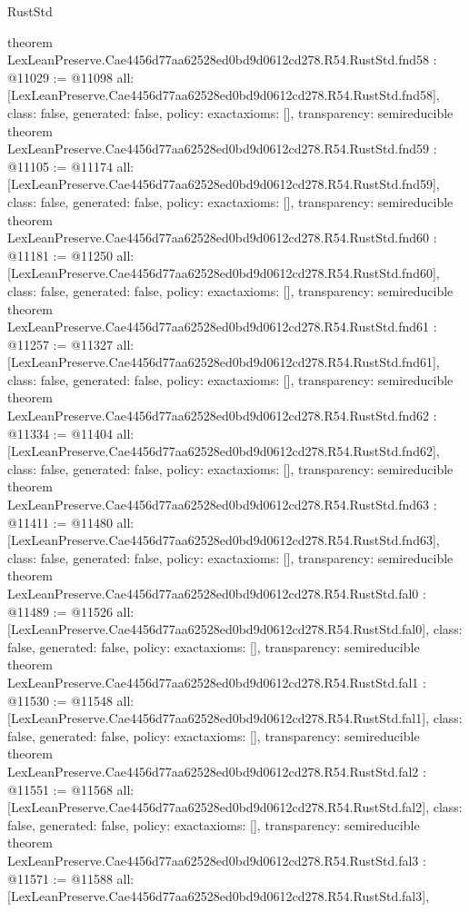 \begin{lexlean}{RustStd}
\begin{coremodule}
{}
theorem LexLeanPreserve.Cae4456d77aa62528ed0bd9d0612cd278.R54.RustStd.fnd58 : @11029 := @11098 {
  all: [LexLeanPreserve.Cae4456d77aa62528ed0bd9d0612cd278.R54.RustStd.fnd58],
  class: false,
  generated: false,
  policy: exact{axioms: []},
  transparency: semireducible
}
theorem LexLeanPreserve.Cae4456d77aa62528ed0bd9d0612cd278.R54.RustStd.fnd59 : @11105 := @11174 {
  all: [LexLeanPreserve.Cae4456d77aa62528ed0bd9d0612cd278.R54.RustStd.fnd59],
  class: false,
  generated: false,
  policy: exact{axioms: []},
  transparency: semireducible
}
theorem LexLeanPreserve.Cae4456d77aa62528ed0bd9d0612cd278.R54.RustStd.fnd60 : @11181 := @11250 {
  all: [LexLeanPreserve.Cae4456d77aa62528ed0bd9d0612cd278.R54.RustStd.fnd60],
  class: false,
  generated: false,
  policy: exact{axioms: []},
  transparency: semireducible
}
theorem LexLeanPreserve.Cae4456d77aa62528ed0bd9d0612cd278.R54.RustStd.fnd61 : @11257 := @11327 {
  all: [LexLeanPreserve.Cae4456d77aa62528ed0bd9d0612cd278.R54.RustStd.fnd61],
  class: false,
  generated: false,
  policy: exact{axioms: []},
  transparency: semireducible
}
theorem LexLeanPreserve.Cae4456d77aa62528ed0bd9d0612cd278.R54.RustStd.fnd62 : @11334 := @11404 {
  all: [LexLeanPreserve.Cae4456d77aa62528ed0bd9d0612cd278.R54.RustStd.fnd62],
  class: false,
  generated: false,
  policy: exact{axioms: []},
  transparency: semireducible
}
theorem LexLeanPreserve.Cae4456d77aa62528ed0bd9d0612cd278.R54.RustStd.fnd63 : @11411 := @11480 {
  all: [LexLeanPreserve.Cae4456d77aa62528ed0bd9d0612cd278.R54.RustStd.fnd63],
  class: false,
  generated: false,
  policy: exact{axioms: []},
  transparency: semireducible
}
theorem LexLeanPreserve.Cae4456d77aa62528ed0bd9d0612cd278.R54.RustStd.fal0 : @11489 := @11526 {
  all: [LexLeanPreserve.Cae4456d77aa62528ed0bd9d0612cd278.R54.RustStd.fal0],
  class: false,
  generated: false,
  policy: exact{axioms: []},
  transparency: semireducible
}
theorem LexLeanPreserve.Cae4456d77aa62528ed0bd9d0612cd278.R54.RustStd.fal1 : @11530 := @11548 {
  all: [LexLeanPreserve.Cae4456d77aa62528ed0bd9d0612cd278.R54.RustStd.fal1],
  class: false,
  generated: false,
  policy: exact{axioms: []},
  transparency: semireducible
}
theorem LexLeanPreserve.Cae4456d77aa62528ed0bd9d0612cd278.R54.RustStd.fal2 : @11551 := @11568 {
  all: [LexLeanPreserve.Cae4456d77aa62528ed0bd9d0612cd278.R54.RustStd.fal2],
  class: false,
  generated: false,
  policy: exact{axioms: []},
  transparency: semireducible
}
theorem LexLeanPreserve.Cae4456d77aa62528ed0bd9d0612cd278.R54.RustStd.fal3 : @11571 := @11588 {
  all: [LexLeanPreserve.Cae4456d77aa62528ed0bd9d0612cd278.R54.RustStd.fal3],
}
\end{coremodule}
\end{lexlean}
